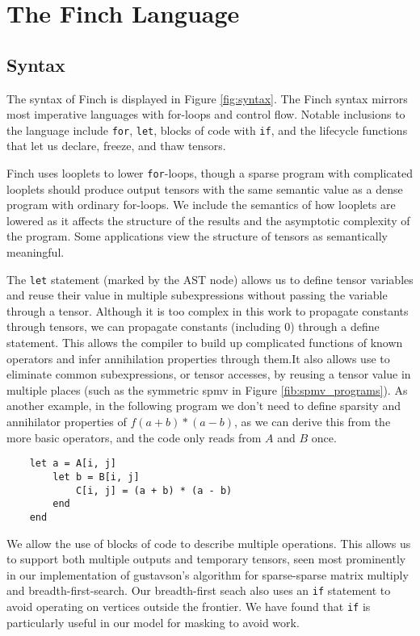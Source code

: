 
\section{The Finch Language}

\subsection{Syntax}

The syntax of Finch is displayed in Figure \ref{fig:syntax}. The Finch syntax
mirrors most imperative languages with for-loops and control flow. Notable
inclusions to the language include \texttt{for},
\texttt{let}, blocks of code with \texttt{if}, and 
the lifecycle functions that let us declare, freeze, and thaw tensors.

Finch uses looplets to lower \texttt{for}-loops, though a sparse
program with complicated looplets should produce output tensors with the same
semantic value as a dense program with ordinary for-loops.  We include the
semantics of how looplets are lowered as it affects the structure of the results
and the asymptotic complexity of the program. Some applications view the
structure of tensors as semantically meaningful.

The \texttt{let} statement (marked by the \finchdefine AST node)
allows us to define tensor variables and reuse their value in multiple
subexpressions without passing the variable through a tensor. Although it is too
complex in this work to propagate constants through tensors, we can propagate
constants (including 0) through a define statement. This allows the compiler to
build up complicated functions of known operators and infer annihilation
properties through them.It also allows use to eliminate common subexpressions,
or tensor accesses, by reusing a tensor value in multiple places (such as the
symmetric spmv in Figure \ref{fib:spmv_programs}). As another example, in the
following program we don't need to define sparsity and annihilator properties of
$f(a + b) * (a - b)$, as we can derive this from the more basic operators, and
the code only reads from $A$ and $B$ once.
\begin{verbatim}
    let a = A[i, j]
        let b = B[i, j]
            C[i, j] = (a + b) * (a - b)
        end
    end
\end{verbatim}

We allow the use of blocks of code to describe multiple operations. This allows
us to support both multiple outputs and temporary tensors, seen most prominently
in our implementation of gustavson's algorithm for sparse-sparse matrix multiply
and breadth-first-search. Our breadth-first seach also uses an
\texttt{if} statement to avoid operating on vertices outside the
frontier. We have found that \texttt{if} is particularly useful in
our model for masking to avoid work.

